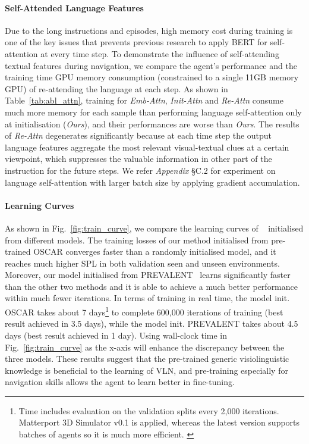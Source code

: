 \documentclass[final]{cvpr}
\begin{document}
\paragraph{Self-Attended Language Features}
Due to the long instructions and episodes, high memory cost during training is one of the key issues that prevents previous research to apply BERT for self-attention at every time step. To demonstrate the influence of self-attending textual features during navigation, we compare the agent's performance and the training time GPU memory consumption (constrained to a single 11GB memory GPU) of re-attending the language at each step. As shown in Table~\ref{tab:abl_attn}, training for \textit{Emb-Attn}, \textit{Init-Attn} and \textit{Re-Attn} consume much more memory for each sample than performing language self-attention only at initialisation (\textit{Ours}), and their performances are worse than \textit{Ours}. 
The results of \textit{Re-Attn} degenerates significantly because at each time step the output language features aggregate the most relevant visual-textual clues at a certain viewpoint, which suppresses the valuable information in other part of the instruction for the future steps. We refer \textit{Appendix} \S C.2 for experiment on language self-attention with larger batch size by applying gradient accumulation.




\paragraph{Learning Curves}
As shown in Fig.~\ref{fig:train_curve}, we compare the learning curves of \vlnbert~ initialised from different models. The training losses of our method initialised from pre-trained OSCAR \cite{li2020oscar} converges faster than a randomly initialised model, and it reaches much higher SPL in both validation seen and unseen environments. Moreover, our model initialised from PREVALENT~\cite{hao2020towards} learns significantly faster than the other two methods and it is able to achieve a much better performance within much fewer iterations. In terms of training in real time, the model init. OSCAR takes about 7 days\footnote{Time includes evaluation on the validation splits every 2,000 iterations. Matterport 3D Simulator v0.1 is applied, whereas the latest version supports batches of agents so it is much more efficient. \label{footnote_time}} to complete 600,000 iterations of training (best result achieved in 3.5 days), while the model init. PREVALENT takes about 4.5 days (best result achieved in 1 day). Using wall-clock time in Fig.~\ref{fig:train_curve} as the x-axis will enhance the discrepancy between the three models. These results suggest that the pre-trained generic visiolinguistic knowledge is beneficial to the learning of VLN, and pre-training especially for navigation skills allows the agent to learn better in fine-tuning.
\end{document}

